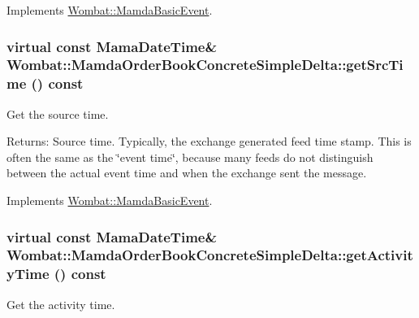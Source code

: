 Implements \hyperlink{classWombat_1_1MamdaBasicEvent_7285491c2c657207a64b1b0449c0339b}{Wombat::Mamda\-Basic\-Event}.\hypertarget{classWombat_1_1MamdaOrderBookConcreteSimpleDelta_47e5a10b4cdcaa31db65651bbbafd159}{
\subsubsection[getSrcTime]{\setlength{\rightskip}{0pt plus 5cm}virtual const Mama\-Date\-Time\& Wombat::Mamda\-Order\-Book\-Concrete\-Simple\-Delta::get\-Src\-Time () const}}
\label{classWombat_1_1MamdaOrderBookConcreteSimpleDelta_47e5a10b4cdcaa31db65651bbbafd159}


Get the source time. 

\begin{Desc}
\item[Returns:]Source time. Typically, the exchange generated feed time stamp. This is often the same as the \char`\"{}event time\char`\"{}, because many feeds do not distinguish between the actual event time and when the exchange sent the message. \end{Desc}


Implements \hyperlink{classWombat_1_1MamdaBasicEvent_60b5d51f3799c4762090505ef5b213e9}{Wombat::Mamda\-Basic\-Event}.\hypertarget{classWombat_1_1MamdaOrderBookConcreteSimpleDelta_83a181dbc82a58ab1c7bd3565780e7bd}{
\subsubsection[getActivityTime]{\setlength{\rightskip}{0pt plus 5cm}virtual const Mama\-Date\-Time\& Wombat::Mamda\-Order\-Book\-Concrete\-Simple\-Delta::get\-Activity\-Time () const}}
\label{classWombat_1_1MamdaOrderBookConcreteSimpleDelta_83a181dbc82a58ab1c7bd3565780e7bd}


Get the activity time. 

